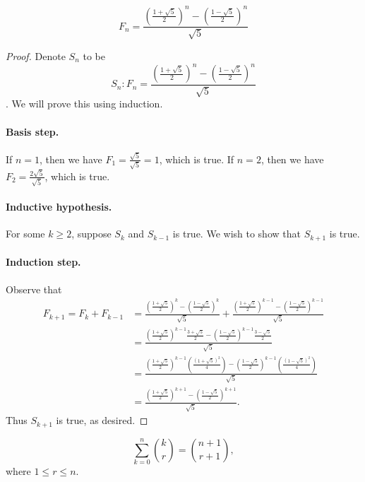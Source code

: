 \documentclass{exam}
\newcommand{\paren}[1]{\left(#1\right)}
\begin{document}
\begin{proposition}{10.30}
    $$F_n=\frac{\paren{\frac{1+\sqrt5}2}^n - \paren{\frac{1-\sqrt5}2}^n}{\sqrt5}$$
\end{proposition}

\begin{proof}
    Denote $S_n$ to be $$S_n: F_n=\frac{\paren{\frac{1+\sqrt5}2}^n - \paren{\frac{1-\sqrt5}2}^n}{\sqrt5}$$. We will prove this using induction.

    \paragraph{Basis step.} If $n = 1$, then we have $F_1 = \frac{\sqrt5}{\sqrt5} = 1$, which is true. If $n = 2$, then we have $F_2 = \frac{2\sqrt5}{\sqrt5}$, which is true.

    \paragraph{Inductive hypothesis.} For some $k\ge2$, suppose $S_k$ and $S_{k-1}$ is true. We wish to show that $S_{k+1}$ is true.

    \paragraph{Induction step.} Observe that
    \begin{align*}
        F_{k+1} = F_k + F_{k-1} &= \frac{\paren{\frac{1+\sqrt5}2}^k - \paren{\frac{1-\sqrt5}2}^k}{\sqrt5} + \frac{\paren{\frac{1+\sqrt5}2}^{k-1} - \paren{\frac{1-\sqrt5}2}^{k-1}}{\sqrt5}\\
        &=\frac{\paren{\frac{1+\sqrt5}2}^{k-1}\frac{3+\sqrt5}2 - \paren{\frac{1-\sqrt5}2}^{k-1}\frac{3-\sqrt5}2}{\sqrt5}\\
        &=\frac{\paren{\frac{1+\sqrt5}2}^{k-1}\paren{\frac{(1+\sqrt5)^2}4} - \paren{\frac{1-\sqrt5}2}^{k-1}\paren{\frac{(1-\sqrt5)^2}4}}{\sqrt5}\\
        &=\frac{\paren{\frac{1+\sqrt5}2}^{k+1} - \paren{\frac{1-\sqrt5}2}^{k+1}}{\sqrt5}.
    \end{align*}
    Thus $S_{k+1}$ is true, as desired.
\end{proof}

\begin{proposition}{10.31}
    $$\sum_{k=0}^n\binom k r=\binom{n+1}{r+1},$$ where $1\le r\le n$.
\end{proposition}
\end{document}

